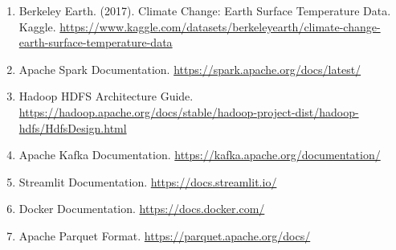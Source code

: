 \documentclass[12pt,a4paper]{scrartcl}
\begin{document}
\begin{enumerate}
    \item Berkeley Earth. (2017). Climate Change: Earth Surface Temperature Data. Kaggle. \url{https://www.kaggle.com/datasets/berkeleyearth/climate-change-earth-surface-temperature-data}
    
    \item Apache Spark Documentation. \url{https://spark.apache.org/docs/latest/}
    
    \item Hadoop HDFS Architecture Guide. \url{https://hadoop.apache.org/docs/stable/hadoop-project-dist/hadoop-hdfs/HdfsDesign.html}
    
    \item Apache Kafka Documentation. \url{https://kafka.apache.org/documentation/}
    
    \item Streamlit Documentation. \url{https://docs.streamlit.io/}
    
    \item Docker Documentation. \url{https://docs.docker.com/}
    
    \item Apache Parquet Format. \url{https://parquet.apache.org/docs/}
\end{enumerate}
\end{document}
